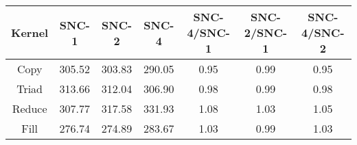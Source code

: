 \begin{tabular}{|c|c|c|c|c|c|c|}  \hline
Kernel&SNC-1&SNC-2&SNC-4 & SNC-4/SNC-1 & SNC-2/SNC-1 & SNC-4/SNC-2 \\ \hline 
Copy & 305.52 & 303.83 & 290.05  & 0.95 & 0.99 & 0.95 \\ \hline 
Triad & 313.66 & 312.04 & 306.90  & 0.98 & 0.99 & 0.98 \\ \hline 
Reduce & 307.77 & 317.58 & 331.93  & 1.08 & 1.03 & 1.05 \\ \hline 
Fill & 276.74 & 274.89 & 283.67  & 1.03 & 0.99 & 1.03 \\ \hline 
\end{tabular}
